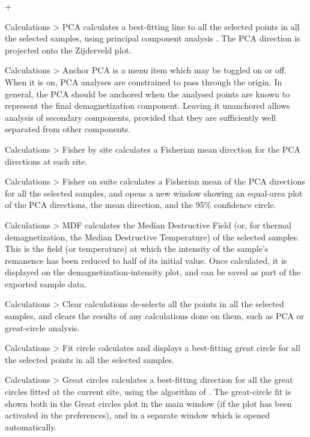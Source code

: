 \documentclass[a4paper,british]{article}
\newcommand{\menuitemlabel}[1]{%
\mbox{\textsf{#1}}\hfil}
\newenvironment{menuitemlist}%
{\begin{list}{}{%
\renewcommand{\makelabel}{\menuitemlabel}%
\setlength{\labelwidth}{35pt}%
\setlength{\leftmargin}%
             {\labelwidth+\labelsep}}}%
{\end{list}}
\newcommand{\ppcmd}[1]{\textsf{#1}} %
\newcommand{\caps}[1]{\MakeTextUppercase{#1}} %
\newcommand{\submenu}{ \textgreater{} } %
\begin{document}
\begin{menuitemlist}

\item[Calculations\submenu PCA] calculates a best-fitting line to all the
  selected points in all the selected samples, using principal component
  analysis \citep{kirschvink1980least}. The \caps{pca} direction is projected
  onto the Zijderveld plot.

\item[Calculations\submenu Anchor PCA] is a menu item which may be toggled on
  or off. When it is on, \caps{pca} analyses are constrained to pass through
  the origin. In general, the \caps{pca} should be anchored when the analysed
  points are known to represent the final demagnetization component. Leaving
  it unanchored allows analysis of secondary components, provided that they
  are sufficiently well separated from other components.

\item[Calculations\submenu Fisher by site] calculates a Fisherian mean
  direction for the \caps{pca} directions at each site.

\item[Calculations\submenu Fisher on suite] calculates a Fisherian mean of
  the \caps{pca} directions for all the selected samples, and opens a new
  window showing an equal-area plot of the \caps{pca} directions, the mean
  direction, and the 95\% confidence circle.

\item[Calculations\submenu MDF] calculates the Median Destructive Field (or,
  for thermal demagnetization, the Median Destructive Temperature) of the
  selected samples. This is the field (or temperature) at which the intensity
  of the sample's remanence has been reduced to half of its initial value.
  Once calculated, it is displayed on the demagnetization-intensity plot, and
  can be saved as part of the exported sample data.

\item[Calculations\submenu Clear calculations] de-selects all the points
in all the selected samples, and clears the results of any calculations done
on them, such as \caps{pca} or great-circle analysis.

\item[Calculations\submenu Fit circle] calculates and displays a
best-fitting great circle for all the selected points in all the selected
samples.

\item[Calculations\submenu Great circles] calculates a best-fitting
direction for all the great circles fitted at the current site,
using the algorithm of \cite{mcfadden1988circles}. The great-circle fit
is shown both in the \ppcmd{Great circles} plot in the main window
(if the plot has been activated in the preferences), and in
a separate window which is opened automatically.


\end{menuitemlist}
\end{document}

